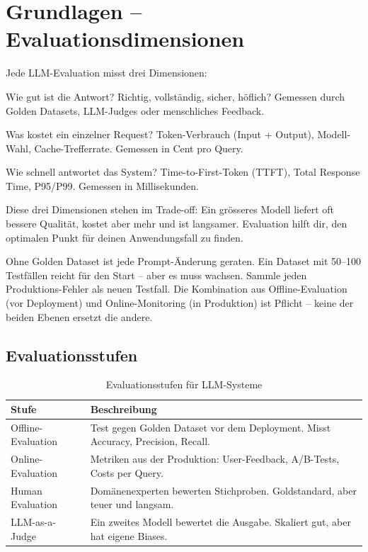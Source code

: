 \section{Grundlagen -- Evaluationsdimensionen}

Jede LLM-Evaluation misst drei Dimensionen:

\begin{description}[leftmargin=*,style=nextline]
    \item[Qualität] Wie gut ist die Antwort? Richtig, vollständig, sicher, höflich? Gemessen durch Golden Datasets, LLM-Judges oder menschliches Feedback.
    \item[Kosten] Was kostet ein einzelner Request? Token-Verbrauch (Input + Output), Modell-Wahl, Cache-Trefferrate. Gemessen in Cent pro Query.
    \item[Latenz] Wie schnell antwortet das System? Time-to-First-Token (TTFT), Total Response Time, P95/P99. Gemessen in Millisekunden.
\end{description}

Diese drei Dimensionen stehen im Trade-off: Ein grösseres Modell liefert oft bessere Qualität, kostet aber mehr und ist langsamer. Evaluation hilft dir, den optimalen Punkt für deinen Anwendungsfall zu finden.

\begin{praxishinweis}
Ohne Golden Dataset ist jede Prompt-Änderung geraten. Ein Dataset mit 50--100 Testfällen reicht für den Start -- aber es muss wachsen. Sammle jeden Produktions-Fehler als neuen Testfall. Die Kombination aus Offline-Evaluation (vor Deployment) und Online-Monitoring (in Produktion) ist Pflicht -- keine der beiden Ebenen ersetzt die andere.
\end{praxishinweis}

\subsection{Evaluationsstufen}

\begin{table}[H]
\centering
\begin{tabularx}{\linewidth}{lX}
\toprule
\textbf{Stufe} & \textbf{Beschreibung} \\
\midrule
Offline-Evaluation & Test gegen Golden Dataset vor dem Deployment. Misst Accuracy, Precision, Recall. \\
Online-Evaluation & Metriken aus der Produktion: User-Feedback, A/B-Tests, Costs per Query. \\
Human Evaluation & Domänenexperten bewerten Stichproben. Goldstandard, aber teuer und langsam. \\
LLM-as-a-Judge & Ein zweites Modell bewertet die Ausgabe. Skaliert gut, aber hat eigene Biases. \\
\bottomrule
\end{tabularx}
\caption{Evaluationsstufen für LLM-Systeme}
\end{table}

